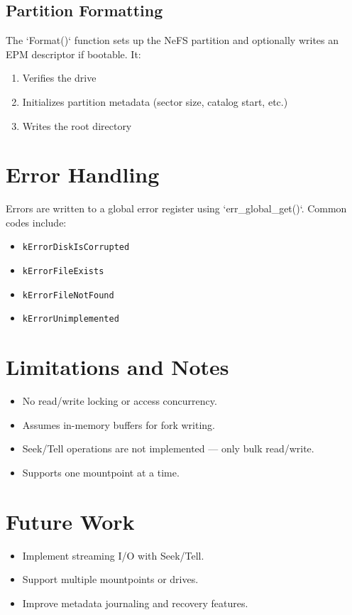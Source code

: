 \documentclass{article}
\begin{document}
\subsection*{Partition Formatting}
The `Format()` function sets up the NeFS partition and optionally writes an EPM descriptor if bootable. It:
\begin{enumerate}
  \item Verifies the drive
  \item Initializes partition metadata (sector size, catalog start, etc.)
  \item Writes the root directory
\end{enumerate}

\section{Error Handling}
Errors are written to a global error register using `err\_global\_get()`. Common codes include:
\begin{itemize}
  \item \texttt{kErrorDiskIsCorrupted}
  \item \texttt{kErrorFileExists}
  \item \texttt{kErrorFileNotFound}
  \item \texttt{kErrorUnimplemented}
\end{itemize}

\section{Limitations and Notes}
\begin{itemize}
  \item No read/write locking or access concurrency.
  \item Assumes in-memory buffers for fork writing.
  \item Seek/Tell operations are not implemented — only bulk read/write.
  \item Supports one mountpoint at a time.
\end{itemize}

\section{Future Work}
\begin{itemize}
  \item Implement streaming I/O with Seek/Tell.
  \item Support multiple mountpoints or drives.
  \item Improve metadata journaling and recovery features.
\end{itemize}
\end{document}
